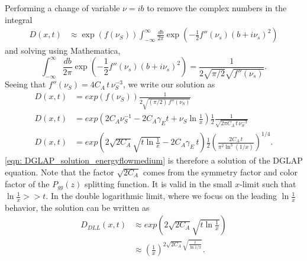 \documentclass[main.tex]{subfiles}
\begin{document}
Performing a change of variable \(\nu = i b\) to remove the complex numbers in the integral
\begin{align}
    D(x,t) &\approx \exp \left(f(\nu_S) \right) \int_{-\infty}^{\infty}\frac{db}{2\pi} \exp \left(-\frac{1}{2} f''(\nu_s)(b+i\nu_s)^2 \right) 
\end{align}
and solving using Mathematica,
\begin{equation}
    \int_{-\infty}^{\infty}\frac{db}{2\pi} \exp \left(-\frac{1}{2} f''(\nu_s)(b+i\nu_s)^2 \right) = \frac{1}{2\sqrt{\pi/2}\sqrt{f''(\nu_s)}}.
\end{equation}
Seeing that \(f''(\nu_S) = 4C_A\,t\, \nu_S^{-3}\), we write our solution as
\begin{align}\label{eqn: DGLAP_solution_energyflowmedium}
    D(x,t) &= exp \left(f(\nu_S) \right)  \frac{1}{2\sqrt{(\pi/2) \, f''(\nu_S)}}  \nonumber\\
    D(x,t) &= exp \left(2C_A \nu_S^{-1}-2C_A\gamma_E t + \nu_S \ln \frac{1}{x} \right)  \frac{1}{2} \frac{1}{\sqrt{2\pi C_A\,t\, \nu_S^{-3}}}  \nonumber\\
    D(x,t) &= exp \left(2\sqrt{2C_A} \sqrt{t \ln \frac{1}{x}} - 2C_A\gamma_E \,t \right)  \frac{1}{2} \left(\frac{2C_A\,t}{\pi^2 \ln^3(1/x)}\right)^{1/4}.
\end{align}
\autoref{eqn: DGLAP_solution_energyflowmedium} is therefore a solution of the DGLAP equation. Note that the factor \(\sqrt{2C_A}\) comes from the symmetry factor and color factor of the \(P_{gg}(z)\) splitting function. It is valid in the small \(x\)-limit such that \(\ln \frac{1}{x} >> t\). In the double logarithmic limit, where we focus on the leading \(\ln \frac{1}{x}\) behavior, the solution can be written as
\begin{align}\label{eqn: DGLAP_DLL_solution}
    D_{\textit{DLL}}(x,t) &\approx exp \left(2\sqrt{2C_A} \sqrt{t \ln \frac{1}{x}} \right) \nonumber \\
    &\approx \left(\frac{1}{x}\right)^{ 2\sqrt{2C_A} \sqrt{\frac{t}{\ln 1/x}}}.
\end{align}
\end{document}
